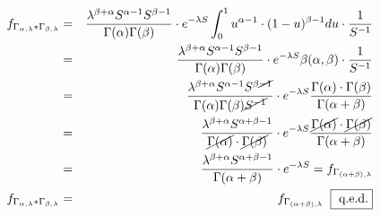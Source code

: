 \begin{uebsp}
\begin{Answer}
\begin{eqnarray*}
f_{\Gamma_{\alpha,\lambda}*\Gamma_{\beta,\lambda}} &=& \frac{\lambda^{\beta+\alpha}S^{\alpha-1}S^{\beta-1}}{\Gamma(\alpha)\Gamma(\beta)}\cdot e^{-\lambda S} \int_0^1 u^{\alpha-1}\cdot (1-u)^{\beta-1} du\cdot \frac{1}{S^{-1}}\\
 &=& \frac{\lambda^{\beta+\alpha}S^{\alpha-1}S^{\beta-1}}{\Gamma(\alpha)\Gamma(\beta)}\cdot e^{-\lambda S} \beta(\alpha, \beta)\cdot \frac{1}{S^{-1}}\\
 &=& \frac{\lambda^{\beta+\alpha}S^{\alpha-1}S^{\beta\cancel{-1}}}{\Gamma(\alpha)\Gamma(\beta)\cancel{S^{-1}}}\cdot e^{-\lambda S} \frac{\Gamma(\alpha)\cdot\Gamma(\beta)}{\Gamma(\alpha+\beta)}\\
 &=& \frac{\lambda^{\beta+\alpha}S^{\alpha+\beta-1}}{\cancel{\Gamma(\alpha)}\cdot\cancel{\Gamma(\beta)}}\cdot e^{-\lambda S} \frac{\cancel{\Gamma(\alpha)}\cdot\cancel{\Gamma(\beta)}}{\Gamma(\alpha+\beta)}\\
 &=& \frac{\lambda^{\beta+\alpha}S^{\alpha+\beta-1}}{\Gamma(\alpha+\beta)}\cdot e^{-\lambda S} = f_{\Gamma_{(\alpha+\beta),\lambda}}\\
f_{\Gamma_{\alpha,\lambda}*\Gamma_{\beta,\lambda}} &=& f_{\Gamma_{(\alpha+\beta),\lambda}}\;\;\fbox{ q.e.d.}\\
\end{eqnarray*}

\end{Answer}
\end{uebsp}
